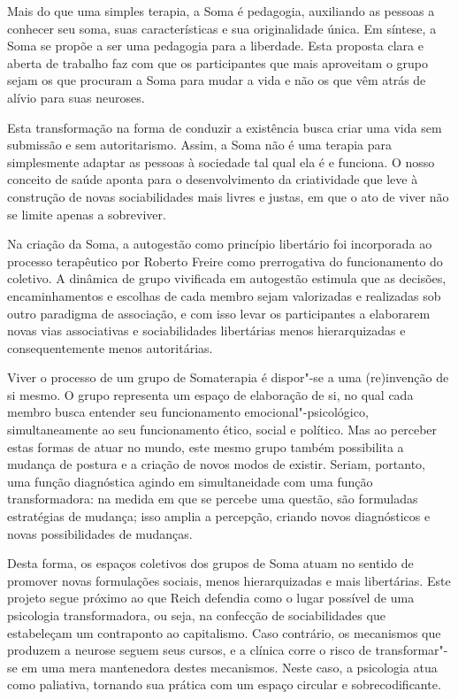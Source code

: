 Mais do que uma simples terapia, a Soma é pedagogia, auxiliando as
pessoas a conhecer seu soma, suas características e sua originalidade
única. Em síntese, a Soma se propõe a ser uma pedagogia para a
liberdade. Esta proposta clara e aberta de trabalho faz com que os
participantes que mais aproveitam o grupo sejam os que procuram a Soma
para mudar a vida e não os que vêm atrás de alívio para suas neuroses.

Esta transformação na forma de conduzir a existência busca criar uma
vida sem submissão e sem autoritarismo. Assim, a Soma não é uma terapia
para simplesmente adaptar as pessoas à sociedade tal qual ela é e
funciona. O nosso conceito de saúde aponta para o desenvolvimento da
criatividade que leve à construção de novas sociabilidades mais livres e
justas, em que o ato de viver não se limite apenas a sobreviver.

Na criação da Soma, a autogestão como princípio libertário foi
incorporada ao processo terapêutico por Roberto Freire como prerrogativa
do funcionamento do coletivo. A dinâmica de grupo vivificada em
autogestão estimula que as decisões, encaminhamentos e escolhas de cada
membro sejam valorizadas e realizadas sob outro paradigma de associação,
e com isso levar os participantes a elaborarem novas vias associativas e
sociabilidades libertárias menos hierarquizadas e consequentemente menos
autoritárias.

Viver o processo de um grupo de Somaterapia é dispor"-se a uma
(re)invenção de si mesmo. O grupo representa um espaço de elaboração de
si, no qual cada membro busca entender seu funcionamento
emocional"-psicológico, simultaneamente ao seu funcionamento ético,
social e político. Mas ao perceber estas formas de atuar no mundo, este
mesmo grupo também possibilita a mudança de postura e a criação de novos
modos de existir. Seriam, portanto, uma função diagnóstica agindo em
simultaneidade com uma função transformadora: na medida em que se
percebe uma questão, são formuladas estratégias de mudança; isso amplia
a percepção, criando novos diagnósticos e novas possibilidades de
mudanças.

Desta forma, os espaços coletivos dos grupos de Soma atuam no sentido de
promover novas formulações sociais, menos hierarquizadas e mais
libertárias. Este projeto segue próximo ao que Reich defendia como o
lugar possível de uma psicologia transformadora, ou seja, na confecção
de sociabilidades que estabeleçam um contraponto ao capitalismo. Caso
contrário, os mecanismos que produzem a neurose seguem seus cursos, e a
clínica corre o risco de transformar"-se em uma mera mantenedora destes
mecanismos. Neste caso, a psicologia atua como paliativa, tornando sua
prática com um espaço circular e sobrecodificante.

